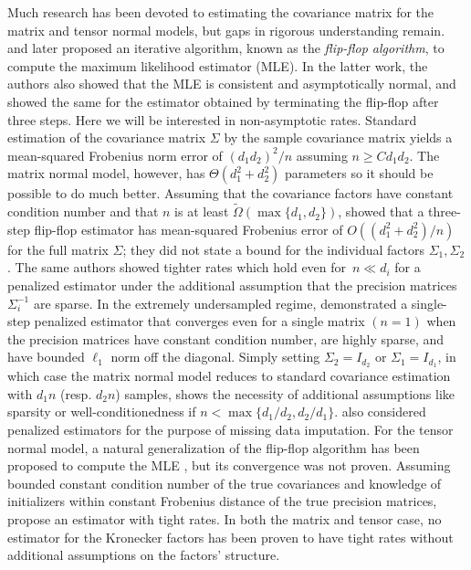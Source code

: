 \documentclass[aos]{imsart}
\theoremstyle{definition}
\numberwithin{equation}{section}
\begin{document}
Much research has been devoted to estimating the covariance matrix for the matrix and tensor normal models, but gaps in rigorous understanding remain.
\cite{dutilleul1999mle} and later \cite{werner2008estimation} proposed an iterative algorithm, known as the \emph{flip-flop algorithm}, to compute the maximum likelihood estimator (MLE).
In the latter work, the authors also showed that the MLE is consistent and asymptotically normal, and showed the same for the estimator obtained by terminating the flip-flop after three steps.
Here we will be interested in non-asymptotic rates.
Standard estimation of the covariance matrix $\Sigma$ by the sample covariance matrix yields a mean-squared Frobenius norm error of $(d_1 d_2)^2/n$ assuming $n \geq C d_1 d_2$.
The matrix normal model, however, has $\Theta(d_1^2 + d_2^2)$ parameters so it should be possible to do much better.
Assuming that the covariance factors have constant condition number and that $n$ is at least $\tilde{\Omega}(\max\{d_1,d_2\})$, \cite{tsiligkaridis2013convergence} showed that a three-step flip-flop estimator has mean-squared Frobenius error of $O((d_1^2 + d_2^2)/n)$ for the full matrix $\Sigma$; they did not state a bound for the individual factors $\Sigma_1,\Sigma_2$.
The same authors showed tighter rates which hold even for~$n\ll d_i$ for a penalized estimator under the additional assumption that the precision matrices $\Sigma_i^{-1}$ are sparse.
In the extremely undersampled regime, \cite{zhou2014gemini} demonstrated a single-step penalized estimator that converges even for a single matrix $(n=1)$ when the precision matrices have constant condition number, are highly sparse, and have bounded $\ell_1$ norm off the diagonal.
Simply setting $\Sigma_2 = I_{d_2}$ or $\Sigma_1 = I_{d_1}$, in which case the matrix normal model reduces to standard covariance estimation with $d_1 n$ (resp. $d_2 n$) samples, shows the necessity of additional assumptions like sparsity or well-conditionedness if $n < \max\{d_1/d_2, d_2/d_1\}$.
\cite{allen2010transposable} also considered penalized estimators for the purpose of missing data imputation.
For the tensor normal model, a natural generalization of the flip-flop algorithm has been proposed to compute the MLE \citep{mardia1993spatial,manceur2013maximum}, but its convergence was not proven.
Assuming bounded constant condition number of the true covariances and knowledge of initializers within constant Frobenius distance of the true precision matrices, \cite{sun2015nonconvex} propose an estimator with tight rates.
In both the matrix and tensor case, no estimator for the Kronecker factors has been proven to have tight rates without additional assumptions on the factors' structure.
\end{document}
